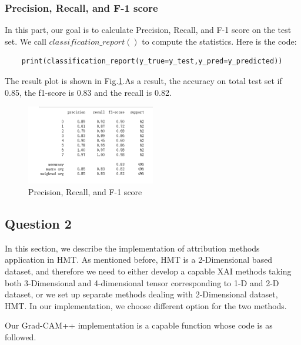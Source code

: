 \documentclass[conference]{IEEEtran}
\begin{document}
\subsubsection{Precision, Recall, and F-1 score}
In this part, our goal is to calculate Precision, Recall, and F-1 score on the test set. We call
$classification\_report()$ to compute the statistics. Here is the code:
\begin{lstlisting}
    print(classification_report(y_true=y_test,y_pred=y_predicted))
\end{lstlisting}
The result plot is shown in Fig.\ref{Fig.t3q1d}.As a result, the accuracy on total test set if 0.85, the f1-score is 0.83 and the recall is 0.82.
\begin{figure}[h] 
    \centering
    \includegraphics[width=0.5\textwidth]{./graphs/T3Q1d.png}
    \caption{Precision, Recall, and F-1 score} 
    \label{Fig.t3q1d} 
\end{figure}

\subsection{Question 2}

In this section, we describe the implementation of attribution methods application in HMT. As mentioned before, HMT is a 2-Dimensional based dataset, and therefore we need to either develop a capable XAI methods taking both 3-Dimensional and 4-dimensional tensor corresponding to 1-D and 2-D dataset, or we set up separate methods dealing with 2-Dimensional dataset, HMT. In our implementation, we choose different option for the two methods.\par

Our Grad-CAM++ implementation is a capable function whose code is as followed.
\end{document}
